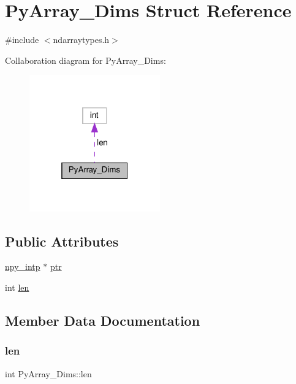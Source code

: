 \hypertarget{structPyArray__Dims}{}\section{Py\+Array\+\_\+\+Dims Struct Reference}
\label{structPyArray__Dims}


{\ttfamily \#include $<$ndarraytypes.\+h$>$}



Collaboration diagram for Py\+Array\+\_\+\+Dims\+:
\nopagebreak
\begin{figure}[H]
\begin{center}
\leavevmode
\includegraphics[width=160pt]{structPyArray__Dims__coll__graph}
\end{center}
\end{figure}
\subsection*{Public Attributes}
\begin{DoxyCompactItemize}
\item 
\hyperlink{npy__common_8h_a2d6effc4d5ecb85675ebfcfaa102b483}{npy\+\_\+intp} $\ast$ \hyperlink{structPyArray__Dims_acc9b33c71575f3e05cc973fb6dac6764}{ptr}
\item 
int \hyperlink{structPyArray__Dims_ae18cd0947ce2f07b62f6d0e67f5620f5}{len}
\end{DoxyCompactItemize}


\subsection{Member Data Documentation}
\mbox{\label{structPyArray__Dims_ae18cd0947ce2f07b62f6d0e67f5620f5}} 
\subsubsection{\texorpdfstring{len}{len}}
{\footnotesize\ttfamily int Py\+Array\+\_\+\+Dims\+::len}

